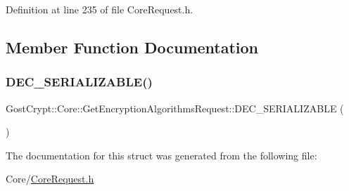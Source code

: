 Definition at line 235 of file Core\+Request.\+h.



\subsection{Member Function Documentation}
\mbox{\label{struct_gost_crypt_1_1_core_1_1_get_encryption_algorithms_request_a21bc1b284c53e98a14b0f26e7960e82d}} 
\subsubsection{\texorpdfstring{D\+E\+C\+\_\+\+S\+E\+R\+I\+A\+L\+I\+Z\+A\+B\+L\+E()}{DEC\_SERIALIZABLE()}}
{\footnotesize\ttfamily Gost\+Crypt\+::\+Core\+::\+Get\+Encryption\+Algorithms\+Request\+::\+D\+E\+C\+\_\+\+S\+E\+R\+I\+A\+L\+I\+Z\+A\+B\+LE (\begin{DoxyParamCaption}\item[{\hyperlink{struct_gost_crypt_1_1_core_1_1_get_encryption_algorithms_request}{Get\+Encryption\+Algorithms\+Request}}]{ }\end{DoxyParamCaption})}



The documentation for this struct was generated from the following file\+:\begin{DoxyCompactItemize}
\item 
Core/\hyperlink{_core_request_8h}{Core\+Request.\+h}\end{DoxyCompactItemize}
